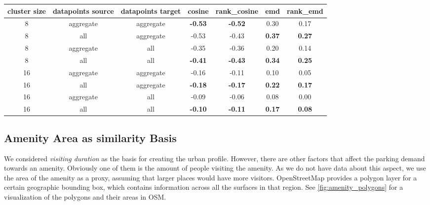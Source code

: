 \documentclass{ws-ijait}
\begin{document}
	\begin{table}[!ht]
		{\begin{tabular}{ | c | c | c | c | c | c | c | }
				\hline
				{cluster size} & {datapoints source} & {datapoints target} & cosine & rank\_cosine & emd & rank\_emd \\ \hline
				8	&	aggregate 	&	aggregate 	& 	\textbf{-0.53}	&	\textbf{-0.52}	&	0.30	&	0.17 	\\ \hline
				8	&	all 		&	aggregate 	& 	-0.53	&	-0.43	&	\textbf{0.37}	&	\textbf{0.27}	\\ \hline \hline
				8	&	aggregate 	&	all 		& 	-0.35	&	-0.36	&	0.20	&	0.14	\\ \hline
				8	&	all			& 	all 		&	\textbf{-0.41}	&	\textbf{-0.43}	&	\textbf{0.34}	&	\textbf{0.25}	\\ \hline \hline
				16	&	aggregate	& 	aggregate 	&	-0.16	&	-0.11	&	0.10	&	0.05	\\ \hline
				16	&	all			& 	aggregate 	& 	\textbf{-0.18}	&	\textbf{-0.17}	&	\textbf{0.22}	&	\textbf{0.17}	\\ \hline \hline
				16	&	aggregate	& 	all 		& 	-0.09	&	-0.06	&	0.08	&	0.00	\\ \hline
				16	&	all			&	all 		&	\textbf{-0.10}	&	\textbf{-0.11}	&	\textbf{0.17}	&	\textbf{0.08}	\\ \hline \hline
		\end{tabular}}
		\label{tab:correlation_values}
	\end{table}
						
	\subsection{Amenity Area as similarity Basis}
	We considered \textit{visiting duration} as the basis for creating the urban profile. However, there are other factors that affect the parking demand towards an amenity.
	Obviously one of them is the amount of people visiting the amenity.
	As we do not have data about this aspect, we use the area of the amenity as a proxy, assuming that larger places would have more visitors.
	OpenStreetMap provides a polygon layer for a certain geographic bounding box, which contains information across all the surfaces in that region. See \cref{fig:amenity_polygons} for a visualization of the polygons and their areas in OSM. 
	
\end{document}
